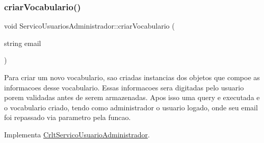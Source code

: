 \subsubsection{\texorpdfstring{criar\+Vocabulario()}{criarVocabulario()}}
{\footnotesize\ttfamily void Servico\+Usuarios\+Administrador\+::criar\+Vocabulario (\begin{DoxyParamCaption}\item[{string}]{email }\end{DoxyParamCaption})\hspace{0.3cm}{\ttfamily [virtual]}}

Para criar um novo vocabulario, sao criadas instancias dos objetos que compoe as informacoes desse vocabulario. Essas informacoes sera digitadas pelo usuario porem validadas antes de serem armazenadas. Apos isso uma query e executada e o vocabulario criado, tendo como administrador o usuario logado, onde seu email foi repassado via parametro pela funcao.

Implementa \mbox{\hyperlink{class_crlt_servico_usuario_administrador_a69862854fcbb5cdc3708f39a6aeeea83}{Crlt\+Servico\+Usuario\+Administrador}}.


